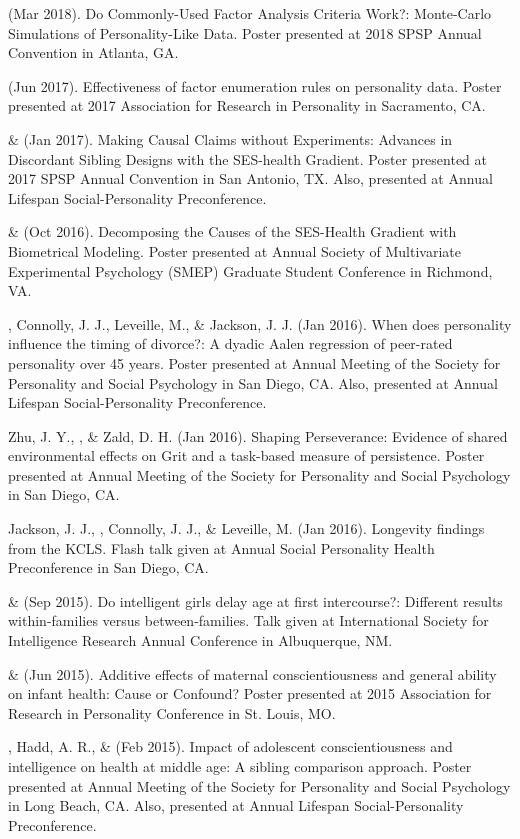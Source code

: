 \begin{etaremune}
\item\meb (Mar 2018). Do Commonly-Used Factor Analysis Criteria Work?: Monte-Carlo Simulations of Personality-Like Data. Poster presented at 2018 SPSP Annual Convention in Atlanta, GA. 
%
\item\meb (Jun 2017). Effectiveness of factor enumeration rules on personality data. Poster presented at 2017 Association for Research in Personality in Sacramento, CA.
%
\item\meb \& \joe (Jan 2017). Making Causal Claims without Experiments: Advances in Discordant Sibling Designs with the SES-health Gradient. Poster presented at 2017 SPSP Annual Convention in San Antonio, TX. Also, presented at Annual Lifespan Social-Personality Preconference.
%
\item\meb \& \joe (Oct 2016). Decomposing the Causes of the SES-Health Gradient with Biometrical Modeling. Poster presented at Annual Society of Multivariate Experimental Psychology (SMEP) Graduate Student Conference in Richmond, VA.
%
\item \meb, Connolly, J. J., Leveille, M., \& Jackson, J. J. (Jan 2016). When does personality influence the timing of divorce?: A dyadic Aalen regression of peer-rated personality over 45 years. Poster presented at Annual Meeting of the Society for Personality and Social Psychology in San Diego, CA. Also, presented at Annual Lifespan Social-Personality Preconference.
%
\item Zhu, J. Y., \meb, \joe \& Zald, D. H. (Jan 2016). Shaping Perseverance: Evidence of shared environmental effects on Grit and a task-based measure of persistence. Poster presented at Annual Meeting of the Society for Personality and Social Psychology in San Diego, CA.
\item Jackson, J. J., \meb, Connolly, J. J., \& Leveille, M. (Jan 2016). Longevity findings from the KCLS. Flash talk given at Annual Social Personality Health Preconference in San Diego, CA. %
%
\item \joe \& \meb (Sep 2015). Do intelligent girls delay age at first intercourse?: Different results within-families versus between-families. Talk given at International Society for Intelligence Research Annual Conference in Albuquerque, NM.
%
\item \meb \& \joe (Jun 2015). Additive effects of maternal conscientiousness and general ability on infant health: Cause or Confound? Poster presented at 2015 Association for Research in Personality Conference in St. Louis, MO. %
%
\item \meb, Hadd, A. R., \& \joe (Feb 2015). Impact of adolescent conscientiousness and intelligence on health at middle age: A sibling comparison approach. Poster presented at Annual Meeting of the Society for Personality and Social Psychology in Long Beach, CA. Also, presented at Annual Lifespan Social-Personality Preconference.

\end{etaremune}
